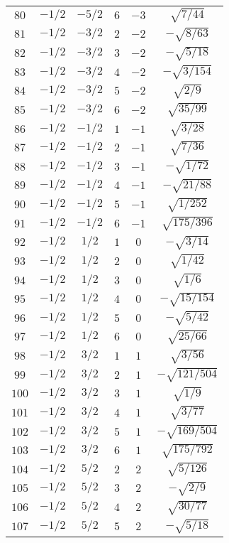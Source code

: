 \begin{table}
\begin{center}
\begin{tabular}{|c|c|c|c|c|c|}
$80$ & $-1/2$ & $-5/2$ & $6$ & $-3$ & $\sqrt{7/44}$ \\ 
$81$ & $-1/2$ & $-3/2$ & $2$ & $-2$ & $-\sqrt{8/63}$ \\ 
$82$ & $-1/2$ & $-3/2$ & $3$ & $-2$ & $-\sqrt{5/18}$ \\ 
$83$ & $-1/2$ & $-3/2$ & $4$ & $-2$ & $-\sqrt{3/154}$ \\ 
$84$ & $-1/2$ & $-3/2$ & $5$ & $-2$ & $\sqrt{2/9}$ \\ 
$85$ & $-1/2$ & $-3/2$ & $6$ & $-2$ & $\sqrt{35/99}$ \\ 
$86$ & $-1/2$ & $-1/2$ & $1$ & $-1$ & $\sqrt{3/28}$ \\ 
$87$ & $-1/2$ & $-1/2$ & $2$ & $-1$ & $\sqrt{7/36}$ \\ 
$88$ & $-1/2$ & $-1/2$ & $3$ & $-1$ & $-\sqrt{1/72}$ \\ 
$89$ & $-1/2$ & $-1/2$ & $4$ & $-1$ & $-\sqrt{21/88}$ \\ 
$90$ & $-1/2$ & $-1/2$ & $5$ & $-1$ & $\sqrt{1/252}$ \\ 
$91$ & $-1/2$ & $-1/2$ & $6$ & $-1$ & $\sqrt{175/396}$ \\ 
$92$ & $-1/2$ & $1/2$ & $1$ & $0$ & $-\sqrt{3/14}$ \\ 
$93$ & $-1/2$ & $1/2$ & $2$ & $0$ & $\sqrt{1/42}$ \\ 
$94$ & $-1/2$ & $1/2$ & $3$ & $0$ & $\sqrt{1/6}$ \\ 
$95$ & $-1/2$ & $1/2$ & $4$ & $0$ & $-\sqrt{15/154}$ \\ 
$96$ & $-1/2$ & $1/2$ & $5$ & $0$ & $-\sqrt{5/42}$ \\ 
$97$ & $-1/2$ & $1/2$ & $6$ & $0$ & $\sqrt{25/66}$ \\ 
$98$ & $-1/2$ & $3/2$ & $1$ & $1$ & $\sqrt{3/56}$ \\ 
$99$ & $-1/2$ & $3/2$ & $2$ & $1$ & $-\sqrt{121/504}$ \\ 
$100$ & $-1/2$ & $3/2$ & $3$ & $1$ & $\sqrt{1/9}$ \\ 
$101$ & $-1/2$ & $3/2$ & $4$ & $1$ & $\sqrt{3/77}$ \\ 
$102$ & $-1/2$ & $3/2$ & $5$ & $1$ & $-\sqrt{169/504}$ \\ 
$103$ & $-1/2$ & $3/2$ & $6$ & $1$ & $\sqrt{175/792}$ \\ 
$104$ & $-1/2$ & $5/2$ & $2$ & $2$ & $\sqrt{5/126}$ \\ 
$105$ & $-1/2$ & $5/2$ & $3$ & $2$ & $-\sqrt{2/9}$ \\ 
$106$ & $-1/2$ & $5/2$ & $4$ & $2$ & $\sqrt{30/77}$ \\ 
$107$ & $-1/2$ & $5/2$ & $5$ & $2$ & $-\sqrt{5/18}$ \\ 

\end{tabular}
\end{center}
\end{table}
